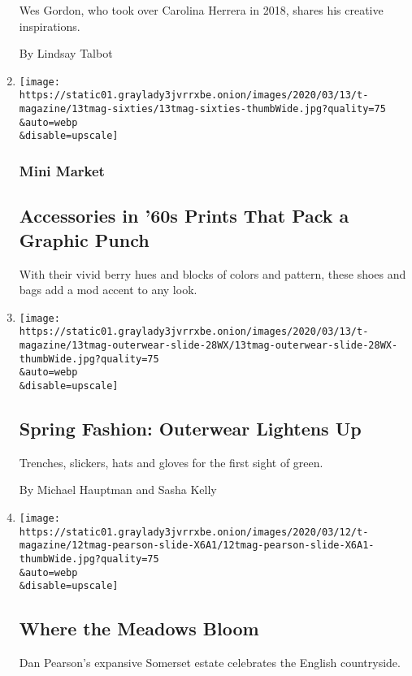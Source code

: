 \begin{enumerate}
  Wes Gordon, who took over Carolina Herrera in 2018, shares his
  creative inspirations.

  By Lindsay Talbot
\item
  \href{/2020/03/13/t-magazine/accessories-60s-prints.html}{}

  \texttt{[image: https://static01.graylady3jvrrxbe.onion/images/2020/03/13/t-magazine/13tmag-sixties/13tmag-sixties-thumbWide.jpg?quality=75\\\&auto=webp\\\&disable=upscale]}

  \hypertarget{mini-market}{%
  \subsubsection{Mini Market}\label{mini-market}}

  \hypertarget{accessories-in-60s-prints-that-pack-a-graphic-punch}{%
  \subsection{Accessories in '60s Prints That Pack a Graphic
  Punch}\label{accessories-in-60s-prints-that-pack-a-graphic-punch}}

  With their vivid berry hues and blocks of colors and pattern, these
  shoes and bags add a mod accent to any look.
\item
  \href{/2020/03/13/t-magazine/spring-outerwear.html}{}

  \texttt{[image: https://static01.graylady3jvrrxbe.onion/images/2020/03/13/t-magazine/13tmag-outerwear-slide-28WX/13tmag-outerwear-slide-28WX-thumbWide.jpg?quality=75\\\&auto=webp\\\&disable=upscale]}

  \hypertarget{spring-fashion-outerwear-lightens-up}{%
  \subsection{Spring Fashion: Outerwear Lightens
  Up}\label{spring-fashion-outerwear-lightens-up}}

  Trenches, slickers, hats and gloves for the first sight of green.

  By Michael Hauptman and Sasha Kelly
\item
  \href{/slideshow/2020/03/12/t-magazine/where-the-meadows-bloom.html}{}

  \texttt{[image: https://static01.graylady3jvrrxbe.onion/images/2020/03/12/t-magazine/12tmag-pearson-slide-X6A1/12tmag-pearson-slide-X6A1-thumbWide.jpg?quality=75\\\&auto=webp\\\&disable=upscale]}

  \hypertarget{where-the-meadows-bloom}{%
  \subsection{Where the Meadows Bloom}\label{where-the-meadows-bloom}}

  Dan Pearson's expansive Somerset estate celebrates the English
  countryside.
\end{enumerate}

